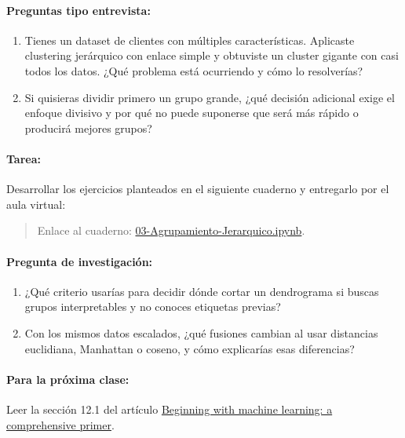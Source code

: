 \documentclass[a4,11pt]{aleph-notas}
\begin{document}
\paragraph{Preguntas tipo entrevista:} 
\begin{enumerate}[leftmargin=*]
    \item Tienes un dataset de clientes con múltiples características. Aplicaste clustering jerárquico con enlace simple y obtuviste un cluster gigante con casi todos los datos. ¿Qué problema está ocurriendo y cómo lo resolverías?
    
    \item Si quisieras dividir primero un grupo grande, ¿qué decisión adicional exige el enfoque divisivo y por qué no puede suponerse que será más rápido o producirá mejores grupos?
\end{enumerate}

\paragraph{Tarea:}  
Desarrollar los ejercicios planteados en el siguiente cuaderno y entregarlo por el aula virtual:
\begin{quote}
    Enlace al cuaderno: \href{https://colab.research.google.com/github/andres-merino/AprendizajeAutomaticoInicial-05-N0105/blob/main/2-Ejercicios/03-Agrupamiento-Jerarquico.ipynb}{03-Agrupamiento-Jerarquico.ipynb}.
\end{quote}

\paragraph{Pregunta de investigación:}  
\begin{enumerate}[leftmargin=*]
    \item ¿Qué criterio usarías para decidir dónde cortar un dendrograma si buscas grupos interpretables y no conoces etiquetas previas?
    \item Con los mismos datos escalados, ¿qué fusiones cambian al usar distancias euclidiana, Manhattan o coseno, y cómo explicarías esas diferencias?
\end{enumerate}
    
\paragraph{Para la próxima clase:}  Leer la sección 12.1 del artículo \href{https://link.springer.com/article/10.1140/epjs/s11734-021-00209-7}{Beginning with machine learning: a comprehensive primer}.
\end{document}
